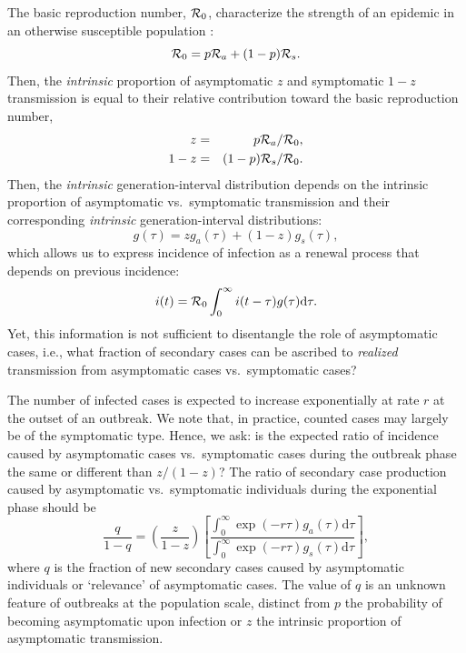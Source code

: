 The basic reproduction number, ${\cal{R}}_0$, characterize the strength of an epidemic in an otherwise susceptible population \citep{anderson1992infectious}:
\begin{equation}
{\cal{R}}_{0}= p {\cal{R}}_a + (1-p) {\cal{R}}_s.
\end{equation}
Then, the \emph{intrinsic} proportion of asymptomatic $z$ and symptomatic $1-z$ transmission is equal to their relative contribution toward the basic reproduction number, 
\begin{eqnarray}
z &=& p {\cal{R}}_a/{\cal{R}}_{0},\\
1-z &=& (1-p) {\cal{R}}_s/{\cal{R}}_{0}.
\end{eqnarray}
Then, the \emph{intrinsic} generation-interval distribution depends on the intrinsic proportion of asymptomatic vs.~symptomatic transmission and their corresponding \emph{intrinsic} generation-interval distributions:
\begin{equation}
g(\tau) = z g_a(\tau) + (1-z) g_s(\tau),
\end{equation}
which allows us to express incidence of infection as a renewal process that depends on previous incidence:
\begin{equation}
i(t) = {\cal{R}}_{0} \int_0^\infty i(t-\tau) g(\tau) \mathrm{d} \tau.
\end{equation}
Yet, this information is not sufficient to disentangle the role of asymptomatic cases, i.e., what fraction of secondary cases can be ascribed to \emph{realized} transmission from asymptomatic cases vs.~symptomatic cases?

The number of infected cases is expected to increase exponentially at rate $r$ at the outset of an outbreak. We note that, in practice, counted cases may largely be of the symptomatic type. 
Hence, we ask: is the expected ratio of incidence caused by asymptomatic cases vs.~symptomatic cases during the outbreak phase the same or different than $z/(1-z)$?
The ratio of secondary case production caused by asymptomatic vs.~symptomatic individuals during the exponential phase should be
\begin{equation}
\frac{q}{1-q}=\left(\frac{z}{1-z}\right)\left[\frac{\int_0^\infty \exp(-r\tau) g_a(\tau) \mathrm{d}\tau}{\int_0^\infty \exp(-r\tau) g_s(\tau) \mathrm{d}\tau}\right],
\label{eq.qratio}
\end{equation}
where $q$ is the fraction of new secondary cases caused by asymptomatic individuals or `relevance' of asymptomatic cases. 
The value of $q$ is an unknown feature of outbreaks at the population scale, distinct from $p$ the probability of becoming asymptomatic upon infection or $z$ the intrinsic proportion of asymptomatic transmission.

